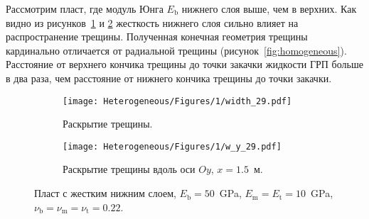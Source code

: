 Рассмотрим пласт, где модуль Юнга $E_\text{b}$ нижнего слоя выше, чем в верхних. Как видно из рисунков~\ref{fig:heterogeneous-2-layer-planar} и \ref{fig:heterogeneous-2-layer-slice} жесткость нижнего слоя сильно влияет на распространение трещины. Полученная конечная геометрия трещины кардинально отличается от радиальной трещины (рисунок~\ref{fig:homogeneous}). Расстояние от верхнего кончика трещины до точки закачки жидкости ГРП больше в два раза, чем расстояние от нижнего кончика трещины до точки закачки.
\begin{figure}[htbp]
    \centering
    \begin{subfigure}[t]{0.4\textwidth}
        \centering
        \texttt{[image: Heterogeneous/Figures/1/width\_29.pdf]}
        \caption{Раскрытие трещины.}
        \label{fig:heterogeneous-2-layer-planar}
    \end{subfigure}
    \hfill 
    \begin{subfigure}[t]{0.55\textwidth}
        \centering
        \texttt{[image: Heterogeneous/Figures/1/w\_y\_29.pdf]}
        \caption{Раскрытие трещины вдоль оси $Oy$, $x=1.5$~м.}
        \label{fig:heterogeneous-2-layer-slice}
    \end{subfigure}
    \caption{Пласт с жестким нижним слоем, $E_\text{b} = 50$~GPa, $E_\text{m} = E_\text{t} = 10$~GPa, $\nu_\text{b} = \nu_\text{m} = \nu_\text{t} = 0.22$.}
    \label{fig:heterogeneous-2-layer}
\end{figure}

